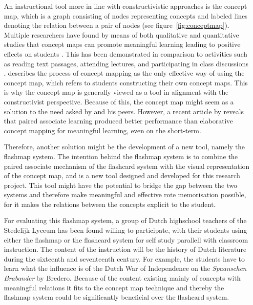 An instructional tool more in line with constructivistic approaches is the concept map, which is a graph consisting of nodes representing concepts and labeled lines denoting the relation between a pair of nodes \cite{ruiz1} (see figure~\ref{fig:conceptmap}). Multiple researchers have found by means of both qualitative and quantitative studies that concept maps can promote meaningful learning leading to positive effects on students \cite{hwang2, subramaniam, canas}. This has been demonstrated in comparison to activities such as reading text passages, attending lectures, and participating in class discussions \cite{singh, nesbit2}.  describes the process of concept mapping as the only effective way of using the concept map, which refers to students constructing their own concept maps. This is why the concept map is generally viewed as a tool in alignment with the constructivist perspective. Because of this, the concept map might seem as a solution to the need asked by  and his peers. However, a recent article by  reveals that paired associate learning produced better performance than elaborative concept mapping for meaningful learning, even on the short-term.


Therefore, another solution might be the development of a new tool, namely the flashmap system. The intention behind the flashmap system is to combine the paired associate mechanism of the flashcard system with the visual representation of the concept map, and is a new tool designed and developed for this research project. This tool might have the potential to bridge the gap between the two systems and therefore make meaningful and effective rote memorisation possible, for it makes the relations between the concepts explicit to the student.

For evaluating this flashmap system, a group of Dutch highschool teachers of the Stedelijk Lyceum has been found willing to participate, with their students using either the flashmap or the flashcard system for self study parallell with classroom instruction. The content of the instruction will be the history of Dutch literature during the sixteenth and seventeenth century. For example, the students have to learn what the influence is of the Dutch War of Independence on the \emph{Spaanschen Brabander} by Bredero. Because of the content existing mainly of concepts with meaningful relations it fits to the concept map technique and thereby the flashmap system could be significantly beneficial over the flashcard system.

